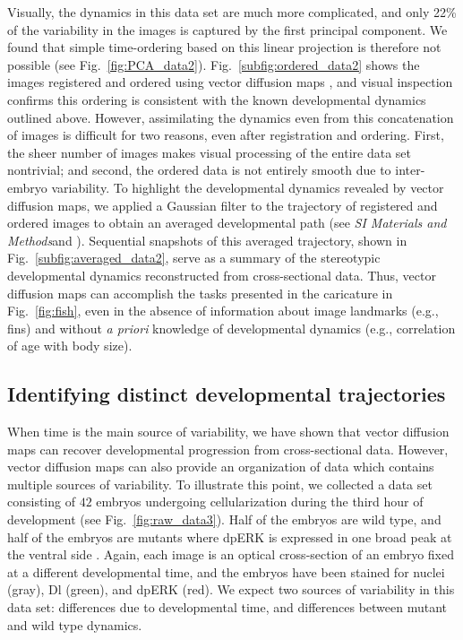 \documentclass{pnastwo}
\newcommand{\SI}[0]{{\it SI Materials and Methods}}
\newcommand{\fig}[0]{Fig.}
\begin{document}
\begin{article}
Visually, the dynamics in this data set are much more complicated, and only 22\% of the variability in the images is captured by the first principal component.
%
We found that simple time-ordering based on this linear projection is therefore not possible (see \fig~\ref{fig:PCA_data2}).
%
\fig~\ref{subfig:ordered_data2} shows the images registered and ordered using vector diffusion maps \cite{singer2012vector}, 
and visual inspection confirms this ordering is consistent with the known developmental dynamics outlined above.
%
However, assimilating the dynamics even from this concatenation of images is difficult for two reasons, even after registration and ordering.
%
First, the sheer number of images makes visual processing of the entire data set nontrivial;
and second, the ordered data is not entirely smooth due to inter-embryo variability.
%
To highlight the developmental dynamics revealed by vector diffusion maps, we applied a Gaussian filter to the trajectory of registered and ordered images to obtain an averaged developmental path (see \SI and  \cite{kemelmacher2011exploring}).  
%
Sequential snapshots of this averaged trajectory, shown in \fig~\ref{subfig:averaged_data2}, serve as a summary of the stereotypic developmental dynamics reconstructed from cross-sectional data.
%
Thus, vector diffusion maps can accomplish the tasks presented in the caricature in \fig~\ref{fig:fish}, even in the absence of information about image landmarks (e.g., fins) and without {\it a priori} knowledge of developmental dynamics (e.g., correlation of age with body size).




\subsection{Identifying distinct developmental trajectories}

When time is the main source of variability, we have shown that vector diffusion maps can recover developmental progression from cross-sectional data.
%
However, vector diffusion maps can also provide an organization of data which contains multiple sources of variability.
%
To illustrate this point, we collected a data set consisting of $42$ embryos undergoing cellularization during the third hour of development (see \fig~\ref{fig:raw_data3}).
%
Half of the embryos are wild type, and half of the embryos are mutants where dpERK is expressed in one broad peak at the ventral side \cite{snail}.
%
Again, each image is an optical cross-section of an embryo fixed at a different developmental time, and the embryos have been stained for nuclei (gray), Dl (green), and dpERK (red).
%
We expect two sources of variability in this data set: differences due to developmental time, and differences between mutant and wild type dynamics.



\end{article}
\end{document}
